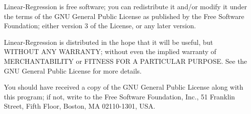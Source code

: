 Linear-\/\+Regression is free software; you can redistribute it and/or modify it under the terms of the G\+NU General Public License as published by the Free Software Foundation; either version 3 of the License, or any later version.

Linear-\/\+Regression is distributed in the hope that it will be useful, but W\+I\+T\+H\+O\+UT A\+NY W\+A\+R\+R\+A\+N\+TY; without even the implied warranty of M\+E\+R\+C\+H\+A\+N\+T\+A\+B\+I\+L\+I\+TY or F\+I\+T\+N\+E\+SS F\+OR A P\+A\+R\+T\+I\+C\+U\+L\+AR P\+U\+R\+P\+O\+SE. See the G\+NU General Public License for more details.

You should have received a copy of the G\+NU General Public License along with this program; if not, write to the Free Software Foundation, Inc., 51 Franklin Street, Fifth Floor, Boston, MA 02110-\/1301, U\+SA. 